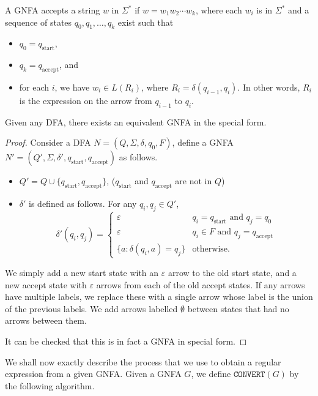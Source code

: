A GNFA accepts a string $w$ in  $\Sigma^*$ if $w=w_1w_2\cdots w_k$, where each $w_i$ is in $\Sigma^*$  and a sequence of states $q_0,q_1,\ldots,q_k$ exist such that
\begin{itemize}
    \item $q_0=q_{\text{start}}$,
    \item $q_k=q_{\text{accept}}$, and
    \item for each $i$, we have $w_i\in L(R_i)$, where $R_i=\delta(q_{i-1},q_i)$. In other words, $R_i$ is the expression on the arrow from $q_{i-1}$ to $q_i$.
\end{itemize}

\begin{lemma}
\label{DFAtoSpGNFA}
Given any DFA, there exists an equivalent GNFA in the special form.
\end{lemma}
\begin{proof}
Consider a DFA $N=(Q,\Sigma,\delta,q_0,F)$, define a GNFA $N'=(Q',\Sigma,\delta',q_{\text{start}},q_{\text{accept}})$ as follows.
\begin{itemize}
    \item $Q'=Q\cup \{q_\text{start}, q_\text{accept}\}$, ($q_\text{start}$ and $q_\text{accept}$ are not in $Q$)
    \item $\delta'$ is defined as follows. For any $q_i,q_j\in Q'$,
    $$
    \delta'(q_i,q_j)=
    \begin{cases}
    \varepsilon & q_i=q_\text{start}\text{ and }q_j=q_0 \\
    \varepsilon & q_i\in F\text{ and } q_j=q_\text{accept} \\
    \{a: \delta(q_i,a)=q_j\} & \text{otherwise.}
    \end{cases}
    $$
\end{itemize}
    We simply add a new start state with an $\varepsilon$ arrow to the old start state, and a new accept state with $\varepsilon$ arrows from each of the old accept states. If any arrows have multiple labels, we replace these with a single arrow whose label is the union of the previous labels. We add arrows labelled $\emptyset$ between states that had no arrows between them.
    
    It can be checked that this is in fact a GNFA in special form.
\end{proof}

We shall now exactly describe the process that we use to obtain a regular expression from a given GNFA. Given a GNFA $G$, we define $\texttt{CONVERT}(G)$ by the following algorithm.

